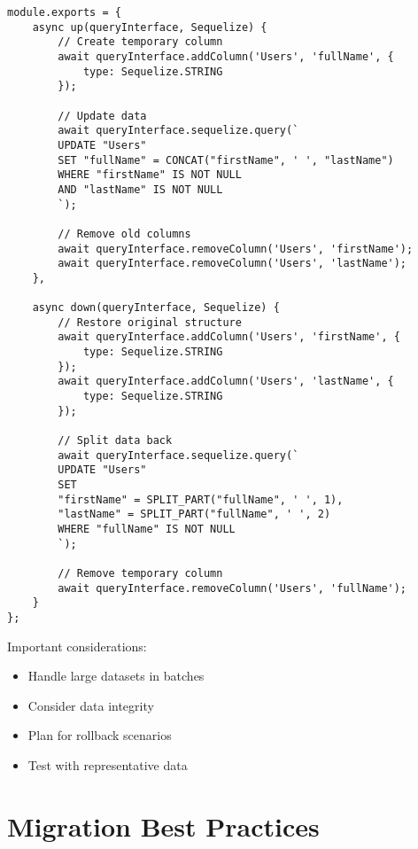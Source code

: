 \documentclass[12pt,a4paper]{book}
\begin{document}
		\begin{verbatim}
module.exports = {
	async up(queryInterface, Sequelize) {
		// Create temporary column
		await queryInterface.addColumn('Users', 'fullName', {
			type: Sequelize.STRING
		});
		
		// Update data
		await queryInterface.sequelize.query(`
		UPDATE "Users"
		SET "fullName" = CONCAT("firstName", ' ', "lastName")
		WHERE "firstName" IS NOT NULL
		AND "lastName" IS NOT NULL
		`);
		
		// Remove old columns
		await queryInterface.removeColumn('Users', 'firstName');
		await queryInterface.removeColumn('Users', 'lastName');
	},
	
	async down(queryInterface, Sequelize) {
		// Restore original structure
		await queryInterface.addColumn('Users', 'firstName', {
			type: Sequelize.STRING
		});
		await queryInterface.addColumn('Users', 'lastName', {
			type: Sequelize.STRING
		});
		
		// Split data back
		await queryInterface.sequelize.query(`
		UPDATE "Users"
		SET 
		"firstName" = SPLIT_PART("fullName", ' ', 1),
		"lastName" = SPLIT_PART("fullName", ' ', 2)
		WHERE "fullName" IS NOT NULL
		`);
		
		// Remove temporary column
		await queryInterface.removeColumn('Users', 'fullName');
	}
};
		\end{verbatim}
		
		Important considerations:
		\begin{itemize}
			\item Handle large datasets in batches
			\item Consider data integrity
			\item Plan for rollback scenarios
			\item Test with representative data
		\end{itemize}
	
	\section{Migration Best Practices}
	
\end{document}
